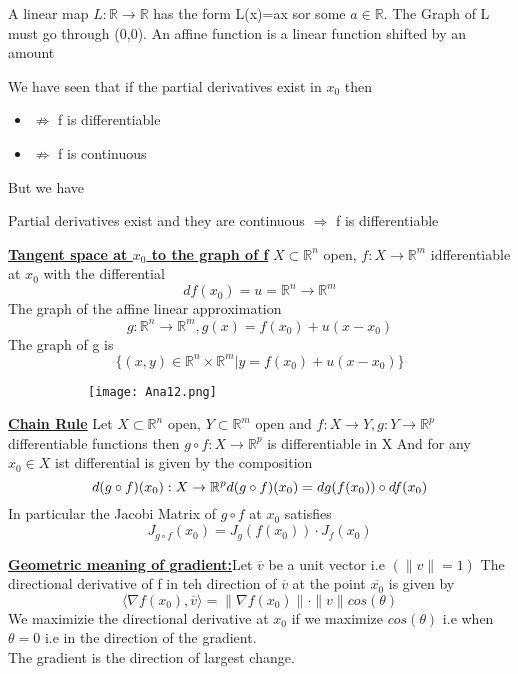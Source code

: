 \documentclass[8pt]{extreport}
\newcommand{\R}{\mathbb{R}}
\begin{document}
A linear map $L : \R \to \R$ has the form L(x)=ax sor some $a \in \R$. The Graph of L must go through (0,0). An affine function is a linear function shifted by an amount

We have seen that if the partial derivatives exist in $x_0$ then
\begin{itemize}
\item $\not \Rightarrow$ f is differentiable
\item $\not \Rightarrow$ f is continuous
\end{itemize}
But we have
\begin{center}
Partial derivatives exist and they are continuous  $\Rightarrow$ f is differentiable
\end{center}


\underline{\textbf{Tangent space at $x_0$ to the graph of f}} $X \subset \R^n$ open, $f: X \to \R^m$ idfferentiable at $x_0$ with the differential
$$df(x_0) = u = \R^n \to \R^m$$
The graph of the affine linear approximation
$$g: \R^n \to \R^m, g(x) = f(x_0) + u(x-x_0)$$
The graph of g is
$$ \{(x,y) \in \R^n \times \R^m | y = f(x_0) + u(x-x_0)\}$$


\begin{figure}[H]
\centering
\begin{subfigure}[b]{0.4\linewidth}
\texttt{[image: Ana12.png]}
\end{subfigure}

\end{figure}

\underline{\textbf{Chain Rule}} Let $X \subset \R^n$ open, $Y \subset \R^m$ open and $f:X \to Y, g:Y \to \R^p$ differentiable functions then $g \circ f : X \to \R^p$ is differentiable in X And for any $x_0 \in X$ ist differential is given by the composition
$$d(g\circ f)(x_0) : X \to \R^p\\ d(g\circ f)(x_0) = dg(f(x_0)) \circ df(x_0)$$
In particular the Jacobi Matrix of $g \circ f$ at $x_0$  satisfies\\
$$J_{g \circ f}(x_0) = J_g(f(x_0)) \cdot J_f(x_0)$$


\underline{\textbf{Geometric meaning of gradient:}}Let $\overline{v}$ be a unit vector i.e $(\|v\|=1)$ The directional derivative of f in teh direction of $\overline{v}$ at the point $\overline{x_0}$ is given by 
$$\langle \nabla f(x_0),\overline{v}\rangle = \|\nabla f(x_0) \| \cdot \|v\| cos(\theta)$$
We maximizie the directional derivative at $x_0$ if we maximize $cos(\theta)$ i.e when $\theta = 0$ i.e in the direction of the gradient.\\
The gradient is the direction of largest change.
\end{document}
